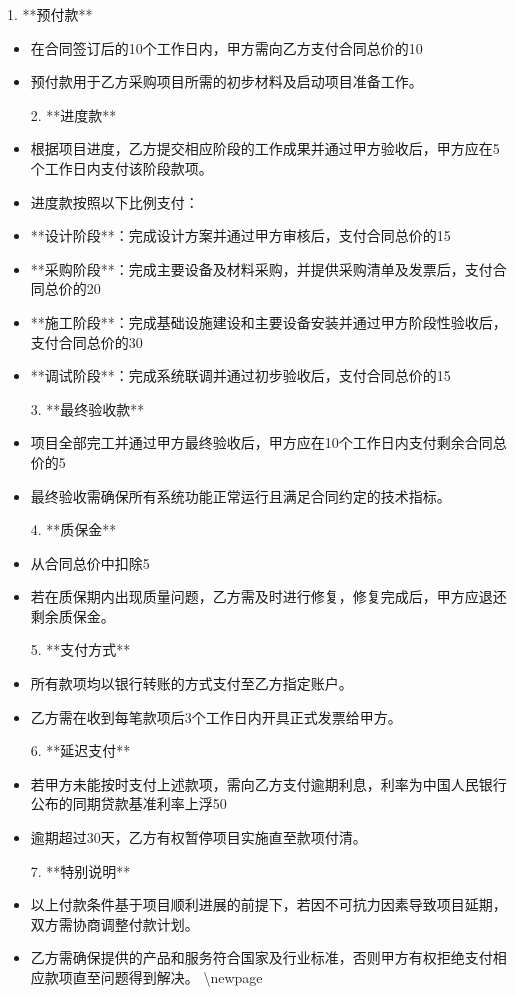 \documentclass[UTF8,a4paper,zihao=-4]{ctexart}
\begin{document}
1. **预付款**
\begin{itemize}
\item 在合同签订后的10个工作日内，甲方需向乙方支付合同总价的10%
\item 预付款用于乙方采购项目所需的初步材料及启动项目准备工作。

2. **进度款**
\item 根据项目进度，乙方提交相应阶段的工作成果并通过甲方验收后，甲方应在5个工作日内支付该阶段款项。
\item 进度款按照以下比例支付：
\item **设计阶段**：完成设计方案并通过甲方审核后，支付合同总价的15%
\item **采购阶段**：完成主要设备及材料采购，并提供采购清单及发票后，支付合同总价的20%
\item **施工阶段**：完成基础设施建设和主要设备安装并通过甲方阶段性验收后，支付合同总价的30%
\item **调试阶段**：完成系统联调并通过初步验收后，支付合同总价的15%

3. **最终验收款**
\item 项目全部完工并通过甲方最终验收后，甲方应在10个工作日内支付剩余合同总价的5%
\item 最终验收需确保所有系统功能正常运行且满足合同约定的技术指标。

4. **质保金**
\item 从合同总价中扣除5%
\item 若在质保期内出现质量问题，乙方需及时进行修复，修复完成后，甲方应退还剩余质保金。

5. **支付方式**
\item 所有款项均以银行转账的方式支付至乙方指定账户。
\item 乙方需在收到每笔款项后3个工作日内开具正式发票给甲方。

6. **延迟支付**
\item 若甲方未能按时支付上述款项，需向乙方支付逾期利息，利率为中国人民银行公布的同期贷款基准利率上浮50%
\item 逾期超过30天，乙方有权暂停项目实施直至款项付清。

7. **特别说明**
\item 以上付款条件基于项目顺利进展的前提下，若因不可抗力因素导致项目延期，双方需协商调整付款计划。
\item 乙方需确保提供的产品和服务符合国家及行业标准，否则甲方有权拒绝支付相应款项直至问题得到解决。
\textbackslash{}newpage

\end{itemize}
\end{document}
